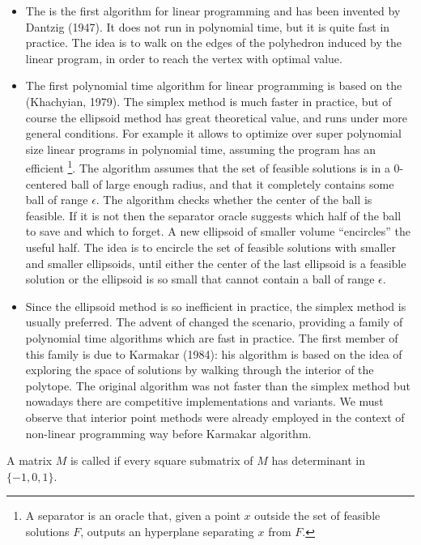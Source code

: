 \documentclass[a4paper,twoside,justified]{tufte-handout}
\begin{document}
\begin{itemize}
  \item The  is the first algorithm for
  linear programming and has been invented by Dantzig (1947). It does
  not run in polynomial time, but it is quite fast in practice. The
  idea is to walk on the edges of the polyhedron induced by the linear
  program, in order to reach the vertex with optimal value.
  \item The first polynomial time algorithm for linear programming is
  based on the  (Khachyian, 1979). The
  simplex method is much faster in practice, but of course the
  ellipsoid method has great theoretical value, and runs under more
  general conditions. For example it allows to optimize over super
  polynomial size linear programs in polynomial time, assuming the
  program has an efficient \footnote{A
    separator is an oracle that, given a point $x$ outside the set
    of feasible solutions $F$, outputs an hyperplane separating $ x$
    from $ F$.}.  The algorithm assumes that the set of feasible
  solutions is in a 0-centered ball of large enough radius, and that
  it completely contains some ball of range $ \epsilon $.
  The algorithm checks whether the center of the ball is feasible. If
  it is not then the separator oracle suggests which half of the ball
  to save and which to forget. A new ellipsoid of smaller volume
  ``encircles'' the useful half.  The idea is to encircle the set of
  feasible solutions with smaller and smaller ellipsoids, until either
  the center of the last ellipsoid is a feasible solution or the
  ellipsoid is so small that cannot contain a ball of range $ \epsilon
  $.
  
  \item Since the ellipsoid method is so inefficient in practice, the
  simplex method is usually preferred. The advent of
   changed the scenario,
  providing a family of polynomial time algorithms which are fast in
  practice. The first member of this family is due to Karmakar (1984):
  his algorithm is based on the idea of exploring the space of
  solutions by walking through the interior of the polytope. The
  original algorithm was not faster than the simplex method but
  nowadays there are competitive implementations and variants. We must
  observe that interior point methods were already employed in the
  context of non-linear programming way before Karmakar algorithm.
\end{itemize}

\begin{definition}\label{def:tum}
  A matrix $ M $ is called  if every
  square submatrix of $ M $ has determinant in $\{-1,0,1\}$.
\end{definition}
\end{document}
